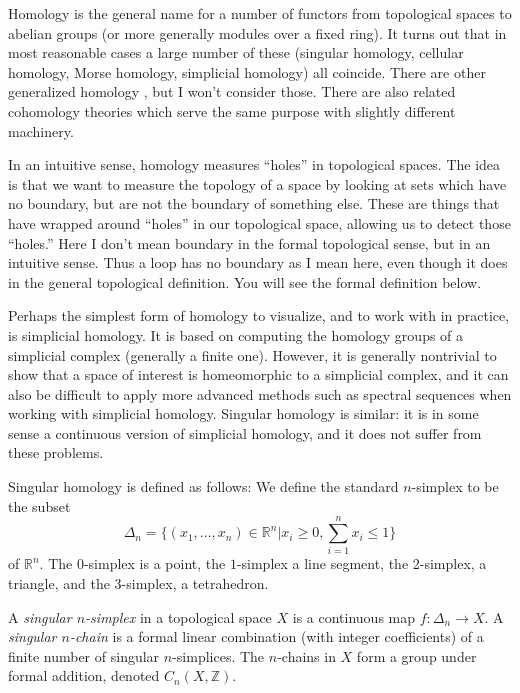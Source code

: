 \documentclass[12pt]{article}
\newcommand{\R}{\mathbb{R}}
\newcommand{\Z}{\mathbb{Z}}
\begin{document}
Homology is the general name for a number of functors from topological spaces to abelian groups (or more generally modules over a fixed ring).  It turns out that in most reasonable cases a large number of these (singular homology, cellular homology, Morse homology, simplicial homology) all coincide.  There are other generalized homology , but I won't consider those.  There are also related cohomology theories which serve the same purpose with slightly different machinery.

In an intuitive sense, homology measures ``holes'' in topological spaces.  The idea is that we want to measure the topology of a space by looking
at sets which have no boundary, but are not the boundary of something else.  These are things
that have wrapped around ``holes'' in our topological space, allowing us to detect those ``holes.''
Here I don't mean boundary in the formal topological sense, but in an intuitive sense.  Thus a loop
has no boundary as I mean here, even though it does in the general topological definition.  You 
will see the formal definition below.

Perhaps the simplest form of homology to visualize, and to work with in practice, is simplicial homology.  It is based on computing the homology groups of a simplicial complex (generally a finite one).  However, it is generally nontrivial to show that a space of interest is homeomorphic to a simplicial complex, and it can also be difficult to apply more advanced methods such as spectral sequences when working with simplicial homology.  Singular homology is similar: it is in some sense a continuous version of simplicial homology, and it does not suffer from these problems.

Singular homology is defined as follows:  We define the standard $n$-simplex to be the subset
\[
\Delta_n=\{(x_1,\ldots,x_n)\in\R^n| x_i\geq 0, \sum_{i=1}^n x_i\leq 1\}
\]
of $\R^n$.  The $0$-simplex is a point, the $1$-simplex a line segment, the 2-simplex, a triangle,
and the 3-simplex, a tetrahedron.

A \emph{singular $n$-simplex} in a topological space $X$ is a continuous map $f:\Delta_n\to X$.
A \emph{singular $n$-chain} is a formal linear combination (with integer coefficients) of a 
finite number of singular $n$-simplices. The $n$-chains in $X$ form a group under formal addition, 
denoted $C_n(X,\Z)$.
\end{document}

